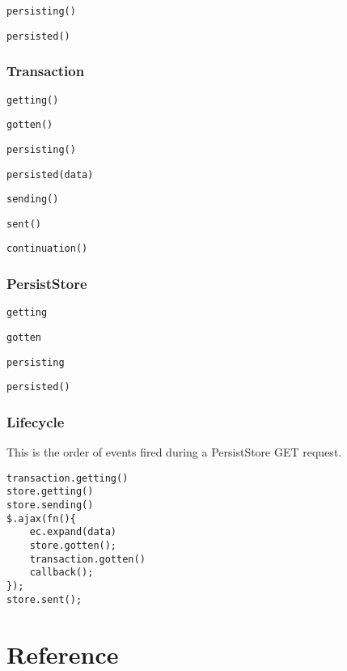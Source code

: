 \documentclass{article}
\newcommand{\ilcode}{\tt}
\begin{document}
{\ilcode persisting()}

{\ilcode persisted()}

\subsubsection{Transaction}
{\ilcode getting()}

{\ilcode gotten()}

{\ilcode persisting()}

{\ilcode persisted(data)}

{\ilcode sending()}

{\ilcode sent()}

{\ilcode continuation()}

\subsubsection{PersistStore}
{\ilcode getting}

{\ilcode gotten}

{\ilcode persisting}

{\ilcode persisted()}

\subsubsection{Lifecycle}
This is the order of events fired during a PersistStore GET request.
\linespread{1}
\begin{lstlisting}
transaction.getting()
store.getting()
store.sending()
$.ajax(fn(){
	ec.expand(data)
	store.gotten();
	transaction.gotten()
	callback();
});
store.sent();
\end{lstlisting}

\section{Reference}
\end{document}
